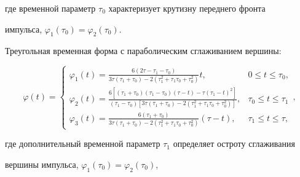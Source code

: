 где временной параметр $\tau_{0}$ характеризует крутизну переднего фронта 

импульса, $\varphi _1 (\tau _0 ) = \varphi _2 (\tau _0 )$.



Треугольная временная форма с параболическим сглаживанием вершины:

\begin{equation}

\label{gurevs:eq4}

\varphi (t) = \left\{ {\begin{array}{ll}

 \varphi _1 (t) = \frac{6\left( {2\tau - \tau _1 - \tau _0 } \right)}{3\tau 

\left( {\tau _1 + \tau _0 } \right) - 2\left( {\tau _1 ^2 + \tau _1 \tau _0 

+ \tau _0 ^2} \right)}t, &

0 \leqslant t \leqslant \tau _0, \\ 

 \varphi _2 (t) = \frac{6\left[ {\left( {\tau _1 + \tau _0 } \right)\left( 

{\tau _1 - \tau _0 } \right)\left( {\tau - t} \right) - \tau \left( {\tau _1 

- t} \right)^2} \right]}{\left( {\tau _1 - \tau _0 } \right)\left[ {3\tau 

\left( {\tau _1 + \tau _0 } \right) - 2\left( {\tau _1 ^2 + \tau _1 \tau _0 

+ \tau _0 ^2} \right)} \right]}, &

\tau _0 \leqslant t \leqslant \tau _1 

\\ 

 \varphi _3 (t) = \frac{6\left( {\tau _1 + \tau _0 } \right)}{3\tau \left( 

{\tau _1 + \tau _0 } \right) - 2\left( {\tau _1 ^2 + \tau _1 \tau _0 + \tau 

_0 ^2} \right)}\left( {\tau - t} \right), &

\tau _1 \leqslant t \leqslant \tau ,

 \end{array}} \right.,

\end{equation}

где дополнительный временной параметр $\tau _{1}$ определяет остроту сглаживания 

вершины импульса, $\varphi _1 (\tau _0 ) = \varphi _2 (\tau _0 )$,


